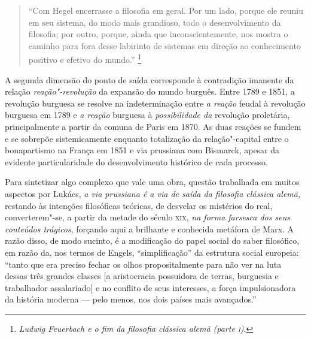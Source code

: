 \begin{quote}
``Com Hegel
encerrasse a filosofia em geral. Por um lado, porque ele reuniu em seu
sistema, do modo mais grandioso, todo o desenvolvimento da filosofia;
por outro, porque, ainda que inconscientemente, nos mostra o caminho
para fora desse labirinto de sistemas em direção ao conhecimento
positivo e efetivo do mundo.'' \footnote{\emph{Ludwig Feuerbach e o fim
  da filosofia clássica alemã (parte \textsc{i})}.}
\end{quote}

A segunda dimensão do ponto de saída corresponde à contradição imanente
da relação \emph{reação"-revolução} da expansão do mundo burguês. Entre
1789 e 1851, a revolução burguesa se resolve na indeterminação entre
\emph{a reação} feudal à revolução burguesa em 1789 e \emph{a reação}
burguesa à \emph{possibilidade da} revolução proletária, principalmente
a partir da comuna de Paris em 1870. As duas reações se fundem e se
sobrepõe sistemicamente enquanto totalização da relação"-capital entre o
bonapartismo na França em 1851 e via prussiana com Bismarck, apesar da
evidente particularidade do desenvolvimento histórico de cada processo.

Para sintetizar algo complexo que vale uma obra, questão trabalhada em
muitos aspectos por Lukács, \emph{a via prussiana é a via de saída da
filosofia clássica alemã,} restando às intenções filosóficas teóricas,
de desvelar os mistérios do real, converterem"-se, a partir da metade do
século \textsc{xix}, \emph{na forma farsesca dos seus conteúdos trágicos},
forçando aqui a brilhante e conhecida metáfora de Marx. A razão disso,
de modo sucinto, é a modificação do papel social do saber filosófico, em
razão da, nos termos de Engels, ``simplificação'' da estrutura social
europeia: ``tanto que era preciso fechar os olhos propositalmente para
não ver na luta dessas três grandes classes {[}a aristocracia possuidora
de terras, burguesia e trabalhador assalariado{]} e no conflito de seus
interesses, a força impulsionadora da história moderna --- pelo menos, nos
dois países mais avançados.''

